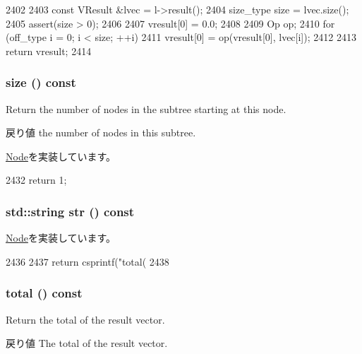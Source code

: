 \begin{DoxyCode}
2402     {
2403         const VResult &lvec = l->result();
2404         size_type size = lvec.size();
2405         assert(size > 0);
2406 
2407         vresult[0] = 0.0;
2408 
2409         Op op;
2410         for (off_type i = 0; i < size; ++i)
2411             vresult[0] = op(vresult[0], lvec[i]);
2412 
2413         return vresult;
2414     }
\end{DoxyCode}
\hypertarget{classStats_1_1SumNode_a503ab01f6c0142145d3434f6924714e7}{
\subsubsection[{size}]{ size () const}}
\label{classStats_1_1SumNode_a503ab01f6c0142145d3434f6924714e7}
Return the number of nodes in the subtree starting at this node. \begin{DoxyReturn}{戻り値}
the number of nodes in this subtree. 
\end{DoxyReturn}


\hyperlink{classStats_1_1Node_a4051d143efd31726fa13df03ae4e1bce}{Node}を実装しています。


\begin{DoxyCode}
2432 { return 1; }
\end{DoxyCode}
\hypertarget{classStats_1_1SumNode_a1b9b8885b0880fc4ddf9a2c7d1ca3dc4}{
\subsubsection[{str}]{\setlength{\rightskip}{0pt plus 5cm}std::string str () const}}
\label{classStats_1_1SumNode_a1b9b8885b0880fc4ddf9a2c7d1ca3dc4}


\hyperlink{classStats_1_1Node_a6522bc65bd97a6b1ef6cdfe78462a919}{Node}を実装しています。


\begin{DoxyCode}
2436     {
2437         return csprintf("total(%
2438     }
\end{DoxyCode}
\hypertarget{classStats_1_1SumNode_a35c6e2ed3fc81b40d69052a062113ead}{
\subsubsection[{total}]{ total () const}}
\label{classStats_1_1SumNode_a35c6e2ed3fc81b40d69052a062113ead}
Return the total of the result vector. \begin{DoxyReturn}{戻り値}
The total of the result vector. 
\end{DoxyReturn}


